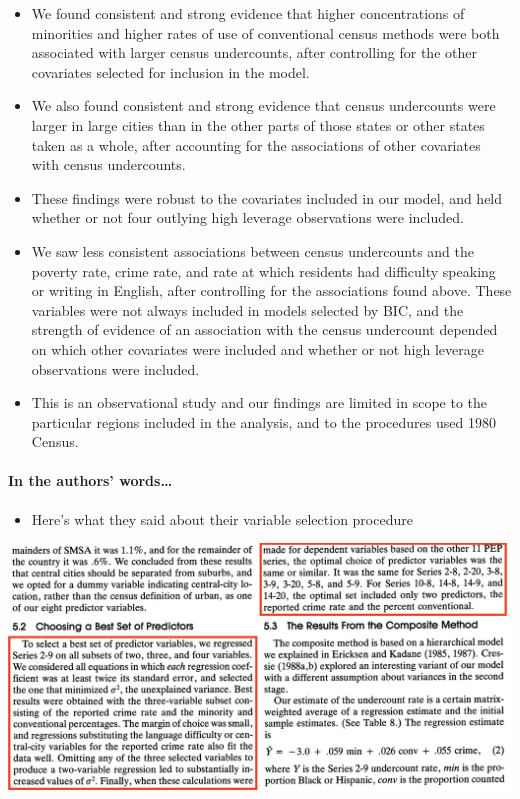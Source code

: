 \documentclass[landscape]{article}
\providecommand{\tightlist}{%
  \setlength{\itemsep}{0pt}\setlength{\parskip}{0pt}}
\let\oldparagraph\paragraph
\renewcommand{\paragraph}[1]{\oldparagraph{#1}\mbox{}}
\begin{document}
\begin{itemize}
\tightlist
\item
  We found consistent and strong evidence that higher concentrations of
  minorities and higher rates of use of conventional census methods were
  both associated with larger census undercounts, after controlling for
  the other covariates selected for inclusion in the model.
\item
  We also found consistent and strong evidence that census undercounts
  were larger in large cities than in the other parts of those states or
  other states taken as a whole, after accounting for the associations
  of other covariates with census undercounts.
\item
  These findings were robust to the covariates included in our model,
  and held whether or not four outlying high leverage observations were
  included.
\item
  We saw less consistent associations between census undercounts and the
  poverty rate, crime rate, and rate at which residents had difficulty
  speaking or writing in English, after controlling for the associations
  found above. These variables were not always included in models
  selected by BIC, and the strength of evidence of an association with
  the census undercount depended on which other covariates were included
  and whether or not high leverage observations were included.
\item
  This is an observational study and our findings are limited in scope
  to the particular regions included in the analysis, and to the
  procedures used 1980 Census.
\end{itemize}

\paragraph{In the authors' words\ldots{}}\label{in-the-authors-words}

\begin{itemize}
\tightlist
\item
  Here's what they said about their variable selection procedure
\end{itemize}

\includegraphics[width=8in]{Ericksen_var_selection.png}
\end{document}
